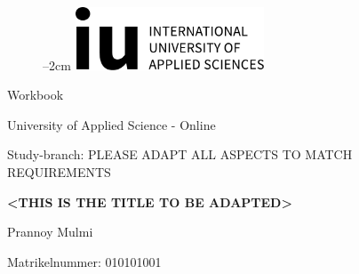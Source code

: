
\label{titlePage}
\begin{figure}[h]
\centering
\advance\leftskip--2cm
\includegraphics[width=0.50\textwidth]{pics/logo.pdf}
\end{figure}
\FloatBarrier

\begin{Large} 
\begin{center}
Workbook
\end{center}
\end{Large} 

\vspace*{5mm}

\begin{large} 
\begin{center}
University of Applied Science - Online
\end{center}
\end{large} 

\begin{large} 
\begin{center}
Study-branch: PLEASE ADAPT ALL ASPECTS TO MATCH REQUIREMENTS
\end{center}
\end{large}

\vspace*{15mm}

\begin{Large} 
\begin{center}
\textbf{<THIS IS THE TITLE TO BE ADAPTED>}
\end{center}
\end{Large}

\vspace*{15mm}

\begin{large} 
\begin{center}
Prannoy Mulmi
\end{center}
\end{large} 

\vspace*{-6mm}

\begin{large} 
\begin{center}
Matrikelnummer: 010101001
\end{center}
\end{large} 

